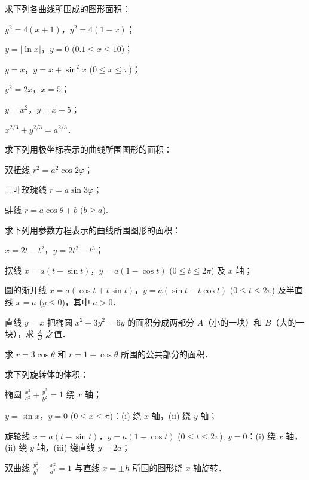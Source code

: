 \begin{xiti}
\item 求下列各曲线所围成的图形面积：
\begin{ziti}
\item $y^2 = 4(x+1)$，$y^2 = 4(1-x)$；
\item $y = |\ln x|$，$y = 0$ ($0.1 \leqslant x \leqslant 10$)；
\item $y = x$，$y = x + \sin^2 x$ ($0 \leqslant x \leqslant \pi$)；
\item $y^2 = 2x$，$x = 5$；
\item $y = x^2$，$y = x + 5$；
\item $x^{2/3} + y^{2/3} = a^{2/3}$．
\end{ziti}

\item 求下列用极坐标表示的曲线所围图形的面积：
\begin{ziti}
\item 双扭线 $r^2 = a^2\cos 2\varphi$；
\item 三叶玫瑰线 $r = a\sin 3\varphi$；
\item 蚌线 $r = a\cos\theta + b$ ($b \geqslant a$).
\end{ziti}

\item 求下列用参数方程表示的曲线所围图形的面积：
\begin{ziti}
\item $x = 2t - t^2$，$y = 2t^2 - t^3$；
\item 摆线 $x = a(t - \sin t)$，$y = a(1 - \cos t)$ ($0 \leqslant t \leqslant 2\pi$) 及 $x$ 轴；
\item 圆的渐开线 $x = a(\cos t + t\sin t)$，$y = a(\sin t - t\cos t)$ ($0 \leqslant t \leqslant 2\pi$) 及半直线 $x = a$ ($y \leqslant 0$)，其中 $a > 0$．
\end{ziti}

\item 直线 $y = x$ 把椭圆 $x^2 + 3y^2 = 6y$ 的面积分成两部分 $A$（小的一块）和 $B$（大的一块），求 $\frac{A}{B}$ 之值．

\item 求 $r = 3\cos\theta$ 和 $r = 1 + \cos\theta$ 所围的公共部分的面积．

\item 求下列旋转体的体积：
\begin{ziti}
\item 椭圆 $\frac{x^2}{a^2} + \frac{y^2}{b^2} = 1$ 绕 $x$ 轴；
\item $y = \sin x$，$y = 0$ ($0 \leqslant x \leqslant \pi$)：(i) 绕 $x$ 轴，(ii) 绕 $y$ 轴；
\item 旋轮线 $x = a(t - \sin t)$，$y = a(1 - \cos t)$ ($0 \leqslant t \leqslant 2\pi$), $y = 0$：(i) 绕 $x$ 轴，(ii) 绕 $y$ 轴，(iii) 绕直线 $y = 2a$；
\item 双曲线 $\frac{y^2}{b^2} - \frac{x^2}{a^2} = 1$ 与直线 $x = \pm h$ 所围的图形绕 $x$ 轴旋转．
\end{ziti}


\end{xiti}
